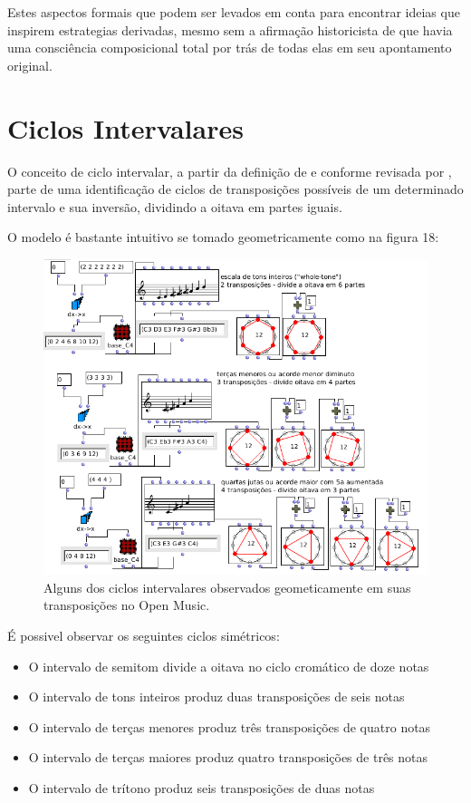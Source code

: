 \documentclass[
	12pt,				%
	openright,			%
	twoside,			%
	a4paper,			%
	english,			%
	french,				%
	spanish,			%
	brazil				%
	]{abntex2}
\begin{document}
Estes aspectos formais que podem ser levados em conta para encontrar ideias que inspirem estrategias derivadas, mesmo sem a afirmação historicista de que havia uma consciência composicional total por trás de todas elas em seu apontamento original.


\section{Ciclos Intervalares}
\label{ciclos}

O conceito de ciclo intervalar, a partir da definição de  e conforme revisada por , parte de uma identificação de ciclos de transposições possíveis de um determinado intervalo e sua inversão, dividindo a oitava em partes iguais.

O modelo é bastante intuitivo se tomado geometricamente como na figura 18:

\begin{figure}[!h]
	\caption{\label{fig_grafico}Alguns dos ciclos intervalares observados geometicamente em suas transposições no Open Music.  }
	\begin{center}
	    \includegraphics[scale=0.5]{ciclos/ciclosOM.png}
	\end{center}
\end{figure}

É possivel observar os seguintes ciclos simétricos:

\begin{itemize}
\item O intervalo de semitom divide a oitava no ciclo cromático de doze notas
\item O intervalo de tons inteiros produz duas transposições de seis notas
\item O intervalo de terças menores produz três transposições de quatro notas
\item O intervalo de terças maiores produz quatro transposições de três notas
\item O intervalo de trítono produz seis transposições de duas notas
\end{itemize}
\end{document}
